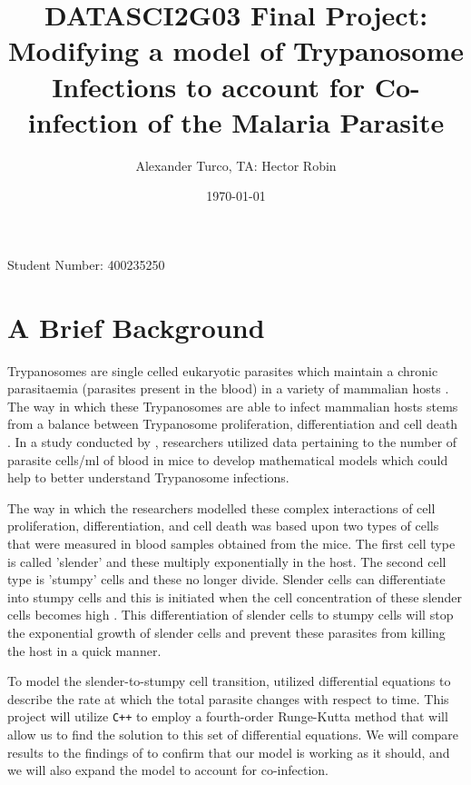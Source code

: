 \documentclass[11pt]{article}
\title{ DATASCI2G03 Final Project: Modifying a model of Trypanosome Infections to account for Co-infection of the Malaria Parasite  }
\author{ Alexander Turco, TA: Hector Robin  }
\date{\today}
\begin{document}
	
	\maketitle
	\vspace{-1cm}
	\begin{center}
		Student Number: 400235250
	\end{center}
	
	\pagebreak
	
	 \tableofcontents
	 \pagebreak
	
	\section{A Brief Background}
	
	Trypanosomes are single celled eukaryotic parasites which maintain a chronic parasitaemia (parasites present in the blood) in a variety of mammalian hosts \citep{tyler2001limitation}. The way in which these Trypanosomes are able to infect mammalian hosts stems from a balance between Trypanosome proliferation, differentiation and cell death \citep{tyler2001limitation}. In a study conducted by \citet{tyler2001limitation}, researchers utilized data pertaining to the number of parasite cells/ml of blood in mice to develop mathematical models which could help to better understand Trypanosome infections.
	
	The way in which the researchers modelled these complex interactions of cell proliferation, differentiation, and cell death was based upon two types of cells that were measured in blood samples obtained from the mice. The first cell type is called 'slender' and these multiply exponentially in the host. The second cell type is 'stumpy' cells and these no longer divide. Slender cells can differentiate into stumpy cells and this is initiated when the cell concentration of these slender cells becomes high \citep{tyler2001limitation}. This differentiation of slender cells to stumpy cells will stop the exponential growth of slender cells and prevent these parasites from killing the host in a quick manner.
	
	To model the slender-to-stumpy cell transition, \citep{tyler2001limitation} utilized differential equations to describe the rate at which the total parasite changes with respect to time. This project will utilize \texttt{C++} to employ a fourth-order Runge-Kutta method that will allow us to find the solution to this set of differential equations. We will compare results to the findings of \citep{tyler2001limitation} to confirm that our model is working as it should, and we will also expand the model to account for co-infection.
	
\end{document}
